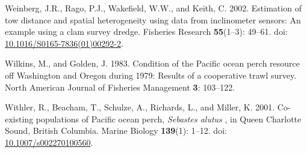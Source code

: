 \documentclass[12pt,]{article}
\begin{document}
\hypertarget{ref-weinberg_estimation_2002}{}
Weinberg, J.R., Rago, P.J., Wakefield, W.W., and Keith, C. 2002.
Estimation of tow distance and spatial heterogeneity using data from
inclinometer sensors: An example using a clam survey dredge. Fisheries
Research \textbf{55}(1--3): 49--61. doi:
\href{https://doi.org/10.1016/S0165-7836(01)00292-2}{10.1016/S0165-7836(01)00292-2}.

\hypertarget{ref-wilkins_condition_1983}{}
Wilkins, M., and Golden, J. 1983. Condition of the Pacific ocean perch
resource off Washington and Oregon during 1979: Results of a cooperative
trawl survey. North American Journal of Fisheries Management \textbf{3}:
103--122.

\hypertarget{ref-withler_co-existing_2001}{}
Withler, R., Beacham, T., Schulze, A., Richards, L., and Miller, K.
2001. Co-existing populations of Pacific ocean perch, \emph{Sebastes
alutus} , in Queen Charlotte Sound, British Columbia. Marine Biology
\textbf{139}(1): 1--12. doi:
\href{https://doi.org/10.1007/s002270100560}{10.1007/s002270100560}.
\end{document}
